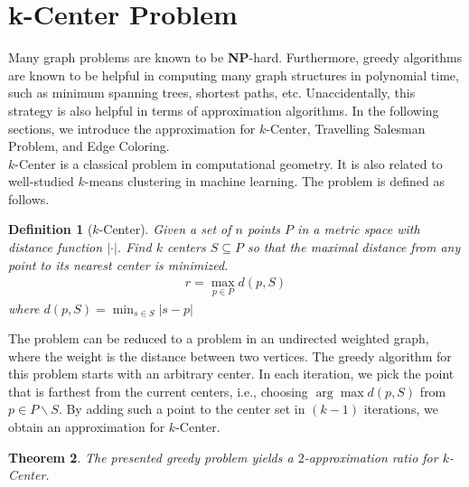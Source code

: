 \documentclass[11pt,psfig,times]{article}
\newcommand*{\NP}{\textbf{NP}}
\newtheorem{theorem}{Theorem}
\newtheorem{definition}[theorem]{Definition}
\begin{document}
\section{k-Center Problem}
Many graph problems are known to be \NP-hard. Furthermore, greedy algorithms are known to be helpful in computing 
many graph structures in polynomial time, such as minimum spanning trees, shortest paths, etc. Unaccidentally, 
this strategy is also helpful in terms of approximation algorithms. 
In the following sections, we introduce the approximation for $k$-Center, Travelling Salesman Problem, and Edge Coloring. \\
$k$-Center is a classical problem in computational geometry. It is also related to well-studied $k$-means clustering in machine learning. 
The problem is defined as follows.
\begin{definition}[$k$-Center]
    Given a set of $n$ points $P$ in a metric space with distance function $|\cdot|$. 
    Find $k$ centers $S \subseteq P$ so that the maximal distance from any point to its nearest center is minimized.
    \begin{align*}
        r = \max_{p \in P} d(p, S)
    \end{align*}
    where $d(p, S) = \min_{s \in S} |s - p| $
\end{definition}
The problem can be reduced to a problem in an undirected weighted graph, where the weight is the distance between two vertices. 
The greedy algorithm for this problem starts with an arbitrary center. In each iteration, we pick the point that 
is farthest from the current centers, i.e., choosing $\arg \max d(p, S)$ from $p \in P \backslash S$. 
By adding such a point to the center set in $(k-1)$ iterations, we obtain an approximation for $k$-Center.
\begin{theorem}
    The presented greedy problem yields a $2$-approximation ratio for $k$-Center.
\end{theorem}
\end{document}
